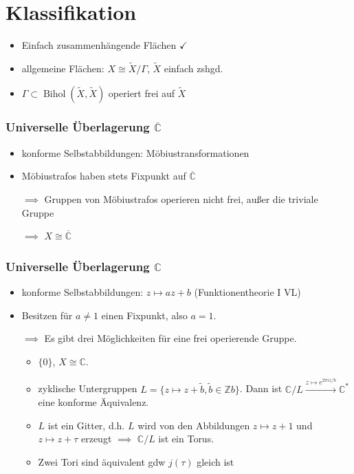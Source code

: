 \documentclass{beamer}
\newcommand{\Z}{\mathbb{Z}}
\newcommand{\C}{\mathbb{C}}
\begin{document}
    \section{Klassifikation}
    \begin{frame}
        \begin{itemize}
            \item Einfach zusammenhängende Flächen $\checkmark$
            \item allgemeine Flächen: $X \cong \tilde{X}/\Gamma$, $\tilde{X}$ einfach zshgd.
            \item $\Gamma \subset \operatorname{Bihol}(\tilde{X}, \tilde{X})$ operiert frei auf $\tilde{X}$
        \end{itemize}
    \end{frame}
    \begin{frame}
        \frametitle{Universelle Überlagerung $\overline{\C}$}
        \begin{itemize}
            \item konforme Selbstabbildungen: Möbiustransformationen
            \item Möbiustrafos haben stets Fixpunkt auf $\overline{\C}$
            \item[$\implies$] Gruppen von Möbiustrafos operieren nicht frei, außer die triviale Gruppe
            \item[$\implies$] $X \cong \overline{\C}$  
        \end{itemize}
    \end{frame}
    \begin{frame}
            \frametitle{Universelle Überlagerung $\C$}
            \begin{itemize}
                \item konforme Selbstabbildungen: $z \mapsto az + b$ (Funktionentheorie I VL) 
                \item Besitzen für $a \neq 1$ einen Fixpunkt, also $a = 1$. 
                \item[$\implies$] Es gibt drei Möglichkeiten für eine frei operierende Gruppe.
            \begin{itemize}
                \item $\{0\}$, $X \cong \C$.
                \item zyklische Untergruppen $L = \{z \mapsto z + \tilde{b}, \tilde{b} \in \Z b\}$. Dann ist $\C/L \xrightarrow{z \mapsto e^{2\pi i z/b}} \C^*$ eine konforme Äquivalenz.
                \item $L$ ist ein Gitter, d.h. $L$ wird von den Abbildungen $z \mapsto z + 1$ und $z \mapsto z + \tau$ erzeugt $\implies$ $\C/L$ ist ein Torus.
                \item Zwei Tori sind äquivalent gdw $j(\tau)$ gleich ist
            \end{itemize}
        \end{itemize}
    \end{frame}
\end{document}

